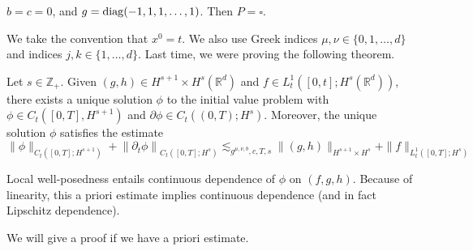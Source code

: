 \begin{example}
$b=c=0$, and $g = {\rm diag}(-1,1,1,\dots, 1)$. Then $P= \square$.
\end{example}
We take the convention that $x^{0}=t$. We also use Greek indices $\mu, \nu \in\{0,1, \ldots, d\}$ and indices $j, k \in\{1, \ldots, d\}$. Last time, we were proving the following theorem. 

\begin{theorem}
\label{thm: Local well-posedness of the initial value problem}
 Let $s \in \mathbb{Z}_{+}$. Given $(g, h) \in H^{s+1} \times H^{s}\left(\mathbb{R}^{d}\right)$ and $f \in L_{t}^{1}\left([0, t] ; H^{s}\left(\mathbb{R}^{d}\right)\right)$, there exists a unique solution $\phi$ to the initial value problem with $\phi \in C_{t}\left([0, T], H^{s+1}\right)$ and $\partial \phi \in C_{t}\left((0, T) ; H^{s}\right)$. Moreover, the unique solution $\phi$ satisfies the estimate
$$
\|\phi\|_{C_{t}\left([0, T] ; H^{s+1}\right)}+\left\|\partial_{t} \phi\right\|_{C_{t}\left([0, T] ; H^{s}\right)} \lesssim_{g^{\mu, \nu, b}, c, T, s}\|(g, h)\|_{H^{s+1} \times H^{s}}+\|f\|_{L_{t}^{1}\left([0, T] ; H^{s}\right)}
$$
\end{theorem}

\begin{remark}
Local well-posedness entails continuous dependence of $\phi$ on $(f, g, h)$. Because of linearity, this a priori estimate implies continuous dependence (and in fact Lipschitz dependence).
\end{remark}


We will give a proof if we have a priori estimate. 

